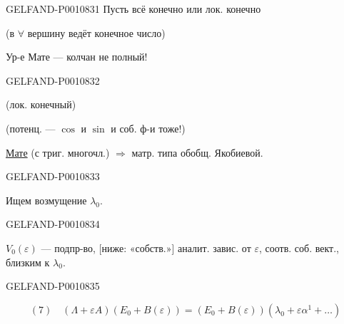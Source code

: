 \begin{GelfandAdjacentEvidence}{GELFAND-P001083}{1}
Пусть всё конечно или лок. конечно

(в $\forall$ вершину ведёт конечное число)

Ур-е Мате — колчан не полный!
\end{GelfandAdjacentEvidence}
\begin{GelfandAdjacentEvidence}{GELFAND-P001083}{2}


(лок. конечный)

(потенц. — $\cos$ и $\sin$ и соб. ф-и тоже!)

\uline{Мате} (с триг. многочл.) $\Rightarrow$ матр. типа обобщ. Якобиевой.
\end{GelfandAdjacentEvidence}
\begin{GelfandAdjacentEvidence}{GELFAND-P001083}{3}


Ищем возмущение $\lambda_0$.

\end{GelfandAdjacentEvidence}
\begin{GelfandAdjacentEvidence}{GELFAND-P001083}{4}


$V_0(\varepsilon)$ — подпр-во, [ниже: «собств.»] аналит. завис. от
$\varepsilon$, соотв. соб. вект., близким к $\lambda_0$.
\end{GelfandAdjacentEvidence}
\begin{GelfandAdjacentEvidence}{GELFAND-P001083}{5}


\[
(7)\quad
(\Lambda+\varepsilon A)(E_0+B(\varepsilon))
=(E_0+B(\varepsilon))(\lambda_0+\varepsilon\alpha^1+\ldots)
\]
\end{GelfandAdjacentEvidence}
